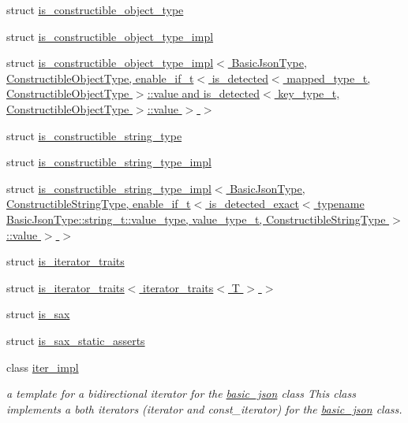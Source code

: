 \begin{DoxyCompactItemize}
\item 
struct \hyperlink{structnlohmann_1_1detail_1_1is__constructible__object__type}{is\+\_\+constructible\+\_\+object\+\_\+type}
\item 
struct \hyperlink{structnlohmann_1_1detail_1_1is__constructible__object__type__impl}{is\+\_\+constructible\+\_\+object\+\_\+type\+\_\+impl}
\item 
struct \hyperlink{structnlohmann_1_1detail_1_1is__constructible__object__type__impl_3_01_basic_json_type_00_01_con6e3270de8050717120afcafe87648413}{is\+\_\+constructible\+\_\+object\+\_\+type\+\_\+impl$<$ Basic\+Json\+Type, Constructible\+Object\+Type, enable\+\_\+if\+\_\+t$<$ is\+\_\+detected$<$ mapped\+\_\+type\+\_\+t, Constructible\+Object\+Type $>$\+::value and is\+\_\+detected$<$ key\+\_\+type\+\_\+t, Constructible\+Object\+Type $>$\+::value $>$ $>$}
\item 
struct \hyperlink{structnlohmann_1_1detail_1_1is__constructible__string__type}{is\+\_\+constructible\+\_\+string\+\_\+type}
\item 
struct \hyperlink{structnlohmann_1_1detail_1_1is__constructible__string__type__impl}{is\+\_\+constructible\+\_\+string\+\_\+type\+\_\+impl}
\item 
struct \hyperlink{structnlohmann_1_1detail_1_1is__constructible__string__type__impl_3_01_basic_json_type_00_01_con83e8ebfe9593f851a60fdb8360df1512}{is\+\_\+constructible\+\_\+string\+\_\+type\+\_\+impl$<$ Basic\+Json\+Type, Constructible\+String\+Type, enable\+\_\+if\+\_\+t$<$ is\+\_\+detected\+\_\+exact$<$ typename Basic\+Json\+Type\+::string\+\_\+t\+::value\+\_\+type, value\+\_\+type\+\_\+t, Constructible\+String\+Type $>$\+::value $>$ $>$}
\item 
struct \hyperlink{structnlohmann_1_1detail_1_1is__iterator__traits}{is\+\_\+iterator\+\_\+traits}
\item 
struct \hyperlink{structnlohmann_1_1detail_1_1is__iterator__traits_3_01iterator__traits_3_01_t_01_4_01_4}{is\+\_\+iterator\+\_\+traits$<$ iterator\+\_\+traits$<$ T $>$ $>$}
\item 
struct \hyperlink{structnlohmann_1_1detail_1_1is__sax}{is\+\_\+sax}
\item 
struct \hyperlink{structnlohmann_1_1detail_1_1is__sax__static__asserts}{is\+\_\+sax\+\_\+static\+\_\+asserts}
\item 
class \hyperlink{classnlohmann_1_1detail_1_1iter__impl}{iter\+\_\+impl}
\begin{DoxyCompactList}\small\item\em a template for a bidirectional iterator for the \hyperlink{classnlohmann_1_1basic__json}{basic\+\_\+json} class This class implements a both iterators (iterator and const\+\_\+iterator) for the \hyperlink{classnlohmann_1_1basic__json}{basic\+\_\+json} class. \end{DoxyCompactList}\item 

\end{DoxyCompactItemize}
